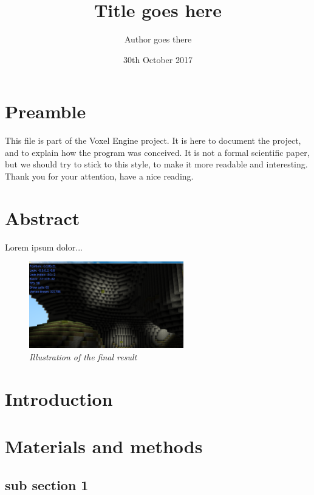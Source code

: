 \documentclass[11pt]{article}
\title{Title goes here}
\author{Author goes there}
\date{30th October 2017}
\begin{document}
	\maketitle
	\tableofcontents

	\section*{Preamble}
	This file is part of the Voxel Engine project. It is here to document the project, and to explain how the program was conceived.
	It is not a formal scientific paper, but we should try to stick to this style, to make it more readable and interesting.
	Thank you for your attention, have a nice reading.
	\newpage
	
	\section{Abstract}
	Lorem ipsum dolor...
	\begin{figure}[!h]
		\begin{center}
			\includegraphics[width=0.6\textwidth,height=0.6\textheight,keepaspectratio]{./assets/title.png}
		\end{center}
		\caption{\textit{Illustration of the final result}}
		\label{Title illustration}
	\end{figure}
	\newpage

	\section{Introduction}
	\newpage

	\section{Materials and methods}
		\subsection{sub section 1}
\end{document}
